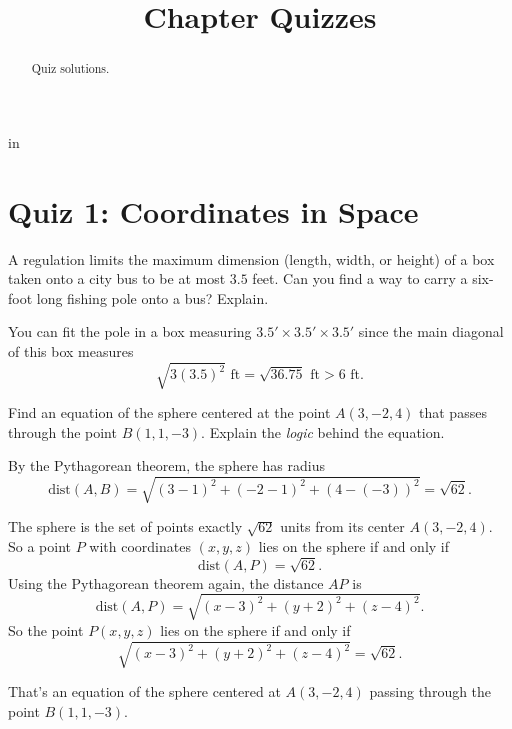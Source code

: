 \documentclass{ximera}
\title{Chapter Quizzes}
\newcommand{\pskip}{\vskip 0.1 in}
\begin{document}
\begin{abstract}
Quiz solutions.
\end{abstract}
\maketitle


\pskip

\section*{Quiz 1: Coordinates in Space}

\begin{question}  \label{Q:943r34r34}
A regulation limits the maximum dimension (length, width, or height) of a box taken onto a city bus to be at most $3.5$ feet. Can you find a way to carry a six-foot long fishing pole onto a bus? Explain.

\begin{explanation}
You can fit the pole in a box measuring $3.5'\times 3.5'\times 3.5'$ since the main diagonal of this box measures
\[
      \sqrt{3 (3.5)^2} \text{ ft} = \sqrt{36.75} \text{ ft} > 6 \text{ ft}.
\]
\end{explanation}


\end{question}


\begin{question}  \label{Q:9df33334}
Find an equation of the sphere centered at the point $A(3,-2,4)$ that passes through the point $B(1,1,-3)$. Explain the \emph{logic} behind the equation.

\begin{explanation}
By the Pythagorean theorem, the sphere has radius 
\[
       \text{dist}(A,B) = \sqrt{(3-1)^2 + (-2-1)^2 + (4 - (-3))^2} = \sqrt{62} .
\]

The sphere is the set of points exactly $\sqrt{62}$ units from its center $A(3,-2,4)$. So a point $P$ with coordinates $(x,y,z)$ lies on the sphere if and only if 
\[
  \text{dist} (A,P) = \sqrt{62} .
\]
Using the Pythagorean theorem again, the distance $AP$ is
\[
        \text{dist} (A,P) = \sqrt{(x-3)^2 + (y+2)^2 + (z-4)^2} .
\]
So the point $P(x,y,z)$ lies on the sphere if and only if 
\[
   \sqrt{(x-3)^2 + (y+2)^2 + (z-4)^2} = \sqrt{62}.
\]

That's an equation of the sphere centered at $A(3,-2,4)$ passing through the point $B(1,1,-3)$.

\end{explanation}

\end{question}
\end{document}

